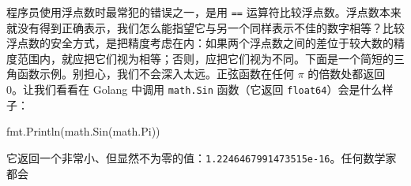 程序员使用浮点数时最常犯的错误之一，是用 \texttt{==} 运算符比较浮点数。浮点数本来就没有得到正确表示，我们怎么能指望它与另一个同样表示不佳的数字相等？比较浮点数的安全方式，是把精度考虑在内：如果两个浮点数之间的差位于较大数的精度范围内，就应把它们视为相等；否则，应把它们视为不同。下面是一个简短的三角函数示例。别担心，我们不会深入太远。正弦函数在任何 $\pi$ 的倍数处都返回 0。让我们看看在 Golang 中调用 \texttt{math.Sin} 函数（它返回 \texttt{float64}）会是什么样子：

\begin{gocode}[]
fmt.Println(math.Sin(math.Pi))
\end{gocode}

它返回一个非常小、但显然不为零的值：\texttt{1.2246467991473515e-16}。任何数学家都会

